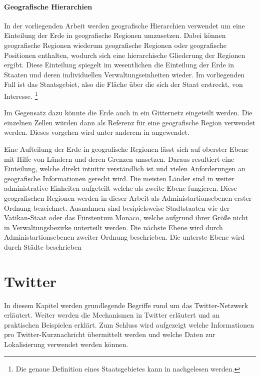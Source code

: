 		\paragraph*{Geografische Hierarchien}
		In der vorliegenden Arbeit werden geografische Hierarchien verwendet um eine Einteilung der Erde in geografische Regionen umzusetzen.
		Dabei können geografische Regionen wiederum geografische Regionen oder geografische Positionen enthalten, wodurch sich eine hierarchische Gliederung der Regionen ergibt.
		Diese Einteilung spiegelt im wesentlichen die Einteilung der Erde in Staaten und deren individuellen Verwaltungseinheiten wieder.
		Im vorliegenden Fall ist das Staatsgebiet, also die Fläche über die sich der Staat erstreckt, von Interesse. \footnote{Die genaue Definition eines Staatsgebietes kann in \cite{jellinek1921} nachgelesen werden.} 

		Im Gegensatz dazu könnte die Erde auch in ein Gitternetz eingeteilt werden. 
		Die einzelnen Zellen würden dann als Referenz für eine geografische Region verwendet werden.
		Dieses vorgehen wird unter anderem in \cite{Serdyukov2009} angewendet.

		Eine Aufteilung der Erde in geografische Regionen lässt sich auf oberster Ebene mit Hilfe von Ländern und deren Grenzen umsetzen. 
		Daraus resultiert eine Einteilung, welche direkt intuitiv verständlich ist und vielen Anforderungen an geografische Informationen gerecht wird.
		Die meisten Länder sind in weiter administrative Einheiten aufgeteilt welche als zweite Ebene fungieren.
		Diese geografischen Regionen werden in dieser Arbeit als Administartionsebenen erster Ordnung bezeichnet.   
		Ausnahmen sind besipielsweise Stadtstaaten wie der Vatikan-Staat oder das Fürstentum Monaco, welche aufgrund ihrer Größe nicht in Verwaltungsbezirke unterteilt werden. 
		Die nächste Ebene wird durch Administartionsebenen zweiter Ordnung beschrieben. 
		Die unterste Ebene wird durch Städte beschrieben

	\section{Twitter} 
	In diesem Kapitel werden grundlegende Begriffe rund um das Twitter-Netzwerk erläutert. 
	Weiter werden die Mechanismen in Twitter erläutert und an praktischen Beispielen erklärt. 
	Zum Schluss wird aufgezeigt welche Informationen pro Twitter-Kurznachricht übermittelt werden und welche Daten zur Lokalisierung verwendet werden können.

